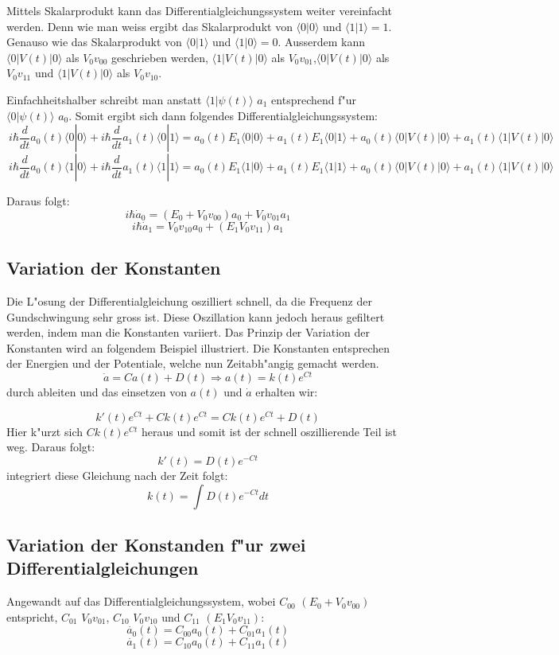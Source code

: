 \begin{refsection}
Mittels Skalarprodukt kann das Differentialgleichungssystem weiter
vereinfacht werden.
Denn wie man weiss ergibt das Skalarprodukt von $\langle0|0\rangle$
und $\langle1|1\rangle = 1$.
Genauso wie das Skalarprodukt von $\langle0|1\rangle$ und
$\langle1|0\rangle = 0$.
Ausserdem kann  $\langle0|V(t)|0\rangle$ als $V_{0}v_{00}$ geschrieben
werden, $\langle1|V(t)|0\rangle$ als $V_{0}v_{01}$,$\langle0|V(t)|0\rangle$
als $V_{0}v_{11}$ und $\langle1|V(t)|0\rangle$ als $V_{0}v_{10}$.

Einfachheitshalber schreibt man anstatt $\langle1|\psi(t)\rangle$ $a_1$
entsprechend f"ur $\langle0|\psi(t)\rangle$ $a_0$.
Somit ergibt sich dann folgendes Differentialgleichungssystem:
\[
\ i\hbar\frac{d}{dt}a_{0}(t)\langle0|0\rangle +i\hbar\frac{d}{dt}a_{1}(t)\langle0|1\rangle = a_{0}(t)E_{1}\langle0|0\rangle + a_{1}(t)E_{1}\langle0|1\rangle + a_{0}(t)\langle0|V(t)|0\rangle+ a_{1}(t)\langle1|V(t)|0\rangle
\]
\[
\ i\hbar\frac{d}{dt}a_{0}(t)\langle1|0\rangle +i\hbar\frac{d}{dt}a_{1}(t)\langle1|1\rangle = a_{0}(t)E_{1}\langle1|0\rangle + a_{1}(t)E_{1}\langle1|1\rangle + a_{0}(t)\langle0|V(t)|0\rangle+ a_{1}(t)\langle1|V(t)|0\rangle
\]

Daraus folgt:
\[
\ i\hbar\dot{a}_0 = (E_{0} + V_{0} v_{00}) a_{0} + V_{0} v_{01} a_{1}
\]
\[
\ i\hbar\dot{a}_1 = V_{0} v_{10} a_{0} + (E_{1} V_{0} v_{11}) a_{1}
\]

\subsection{Variation der Konstanten}
Die L"osung der Differentialgleichung oszilliert schnell, da die
Frequenz der Gundschwingung sehr gross ist.
Diese Oszillation kann jedoch heraus gefiltert werden, indem man die
Konstanten variiert.
Das Prinzip der Variation der Konstanten wird an folgendem Beispiel
illustriert.
Die Konstanten entsprechen der Energien und der Potentiale, welche nun
Zeitabh"angig gemacht werden.
\[
\ \dot{a} = C a(t) + D(t) \Rightarrow a(t) = k(t) e^{C t}
\] 
durch ableiten und das einsetzen von $ a(t)$ und  $ \dot{a} $ erhalten wir:

\[
\ k'(t) e^{C t} + C k(t) e^{C t} = C k(t) e^{C t} + D(t)
\] 
Hier k"urzt sich $ C k(t) e^{C t} $ heraus und somit ist der schnell
oszillierende Teil ist weg.
Daraus folgt:
\[
\ k'(t) = D(t) e^{-C t}
\] 
integriert diese Gleichung nach der Zeit folgt:
\[
\ k(t) = \int D(t) e^{-C t} dt 
\]

\subsection{Variation der Konstanden f"ur zwei Differentialgleichungen}
Angewandt auf das Differentialgleichungssystem, wobei $C_{00}$ $(E_{0} + V_{0} v_{00})$
entspricht, $C_{01}$ $V_{0} v_{01}$, $C_{10}$ $V_{0} v_{10}$ und $C_{11}$ $(E_{1} V_{0} v_{11})$:
\[
\ \dot{a_{0}}(t) = C_{00}a_{0}(t) + C_{01}a_{1}(t)
\]
\[
\ \dot{a_{1}}(t) = C_{10}a_{0}(t) + C_{11}a_{1}(t)
\]


\end{refsection}
